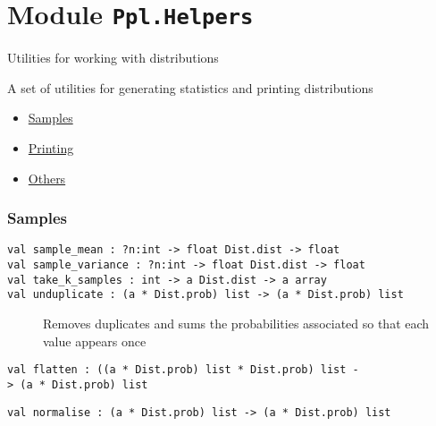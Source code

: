 \section{\texorpdfstring{Module
\texttt{Ppl.Helpers}}{Module Ppl.Helpers}}\label{module-ppl.helpers}

Utilities for working with distributions

A set of utilities for generating statistics and printing distributions

\begin{itemize}
\tightlist
\item
  \protect\hyperlink{samples}{Samples}
\item
  \protect\hyperlink{print}{Printing}
\item
  \protect\hyperlink{otherux5fhelpers}{Others}
\end{itemize}

\hypertarget{samples}{\subsubsection{\texorpdfstring{\protect\hyperlink{samples}{}Samples}{Samples}}\label{samples}}

\begin{description}
\item[{\protect\hyperlink{val-sampleux5fmean}{}\texttt{val\ sample\_mean\ :\ ?⁠n:int\ -\textgreater{}\ float\ Dist.dist\ -\textgreater{}\ float}\\
\protect\hyperlink{val-sampleux5fvariance}{}\texttt{val\ sample\_variance\ :\ ?⁠n:int\ -\textgreater{}\ float\ Dist.dist\ -\textgreater{}\ float}\\
\protect\hyperlink{val-takeux5fkux5fsamples}{}\texttt{val\ take\_k\_samples\ :\ int\ -\textgreater{}\ \textquotesingle{}a\ Dist.dist\ -\textgreater{}\ \textquotesingle{}a\ array}\\
\protect\hyperlink{val-unduplicate}{}\texttt{val\ unduplicate\ :\ (\textquotesingle{}a\ *\ Dist.prob)\ list\ -\textgreater{}\ (\textquotesingle{}a\ *\ Dist.prob)\ list}}]
Removes duplicates and sums the probabilities associated so that each
value appears once
\end{description}

\protect\hyperlink{val-flatten}{}\texttt{val\ flatten\ :\ ((\textquotesingle{}a\ *\ Dist.prob)\ list\ *\ Dist.prob)\ list\ -\textgreater{}\ (\textquotesingle{}a\ *\ Dist.prob)\ list}

\protect\hyperlink{val-normalise}{}\texttt{val\ normalise\ :\ (\textquotesingle{}a\ *\ Dist.prob)\ list\ -\textgreater{}\ (\textquotesingle{}a\ *\ Dist.prob)\ list}

